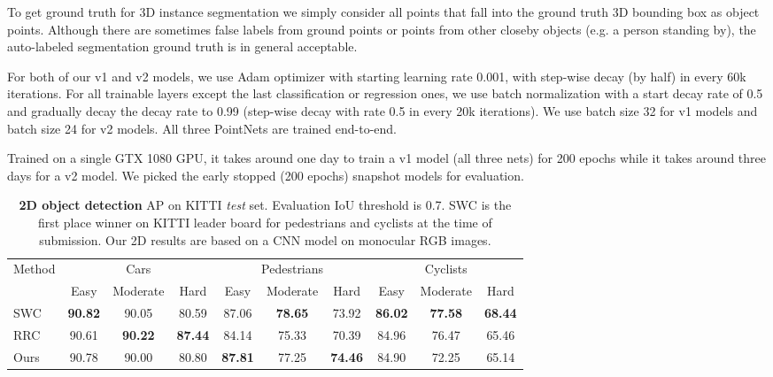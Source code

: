 To get ground truth for 3D instance segmentation we simply consider all points that fall into the ground truth 3D bounding box as object points. Although there are sometimes false labels from ground points or points from other closeby objects (e.g. a person standing by), the auto-labeled segmentation ground truth is in general acceptable.

For both of our v1 and v2 models, we use Adam optimizer with starting learning rate 0.001, with step-wise decay (by half) in every 60k iterations. For all trainable layers except the last classification or regression ones, we use batch normalization with a start decay rate of 0.5 and gradually decay the decay rate to 0.99 (step-wise decay with rate 0.5 in every 20k iterations). We use batch size 32 for v1 models and batch size 24 for v2 models. All three PointNets are trained end-to-end.

Trained on a single GTX 1080 GPU, it takes around one day to train a v1 model (all three nets) for 200 epochs while it takes around three days for a v2 model. We picked the early stopped (200 epochs) snapshot models for evaluation.

\begin{table}[t!]
\small
\centering
\begin{tabular}{l|ccc||ccc||ccc}
\hline
\multirow{2}{*}{Method} & \multicolumn{3}{c||}{Cars} & \multicolumn{3}{c||}{Pedestrians} & \multicolumn{3}{c}{Cyclists} \\ \cline{2-10} 
                        & Easy  & Moderate  & Hard  & Easy     & Moderate    & Hard    & Easy    & Moderate   & Hard   \\ \hline
SWC & \textbf{90.82} & 90.05 & 80.59 & 87.06 & \textbf{78.65} & 73.92 & \textbf{86.02} & \textbf{77.58} & \textbf{68.44} \\
RRC~\cite{Ren17CVPR} & 90.61 & \textbf{90.22} & \textbf{87.44} & 84.14 & 75.33 & 70.39 & 84.96 & 76.47 & 65.46 \\
Ours & 90.78 & 90.00 & 80.80 & \textbf{87.81} & 77.25 & \textbf{74.46} & 84.90 & 72.25 & 65.14 \\ \hline
\end{tabular}
\caption{\textbf{2D object detection} AP on KITTI \emph{test} set. Evaluation IoU threshold is 0.7. SWC is the first place winner on KITTI leader board for pedestrians and cyclists at the time of submission. Our 2D results are based on a CNN model on monocular RGB images.}
\label{tab:kitti_test_2d}
\end{table}

